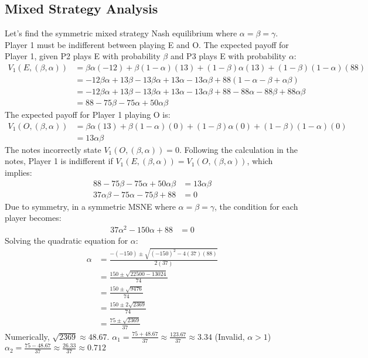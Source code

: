 \documentclass{article}
\begin{document}
\subsection{Mixed Strategy Analysis}
Let's find the symmetric mixed strategy Nash equilibrium where $\alpha = \beta = \gamma$. Player 1 must be indifferent between playing E and O.
The expected payoff for Player 1, given P2 plays E with probability $\beta$ and P3 plays E with probability $\alpha$:
\begin{align*} V_1(E, (\beta, \alpha)) &= \beta \alpha (-12) + \beta (1-\alpha) (13) + (1-\beta) \alpha (13) + (1-\beta) (1-\alpha) (88) \\ &= -12\beta\alpha + 13\beta - 13\beta\alpha + 13\alpha - 13\alpha\beta + 88(1-\alpha-\beta+\alpha\beta) \\ &= -12\beta\alpha + 13\beta - 13\beta\alpha + 13\alpha - 13\alpha\beta + 88 - 88\alpha - 88\beta + 88\alpha\beta \\ &= 88 - 75\beta - 75\alpha + 50\alpha\beta \end{align*}
The expected payoff for Player 1 playing O is:
\begin{align*} V_1(O, (\beta, \alpha)) &= \beta \alpha (13) + \beta (1-\alpha) (0) + (1-\beta) \alpha (0) + (1-\beta) (1-\alpha) (0) \\ &= 13\alpha\beta \end{align*}
The notes incorrectly state $V_1(O, (\beta, \alpha)) = 0$. Following the calculation in the notes, Player 1 is indifferent if $V_1(E, (\beta, \alpha)) = V_1(O, (\beta, \alpha))$, which implies:
\begin{align*} 88 - 75\beta - 75\alpha + 50\alpha\beta &= 13\alpha\beta \\ 37\alpha\beta - 75\alpha - 75\beta + 88 &= 0 \end{align*}
Due to symmetry, in a symmetric MSNE where $\alpha = \beta = \gamma$, the condition for each player becomes:
\begin{align*} 37\alpha^2 - 150\alpha + 88 &= 0 \end{align*}
Solving the quadratic equation for $\alpha$:
\begin{align*} \alpha &= \frac{-(-150) \pm \sqrt{(-150)^2 - 4(37)(88)}}{2(37)} \\ &= \frac{150 \pm \sqrt{22500 - 13024}}{74} \\ &= \frac{150 \pm \sqrt{9476}}{74} \\ &= \frac{150 \pm 2\sqrt{2369}}{74} \\ &= \frac{75 \pm \sqrt{2369}}{37} \end{align*}
Numerically, $\sqrt{2369} \approx 48.67$.
$\alpha_1 = \frac{75 + 48.67}{37} \approx \frac{123.67}{37} \approx 3.34$ (Invalid, $\alpha > 1$)
$\alpha_2 = \frac{75 - 48.67}{37} \approx \frac{26.33}{37} \approx 0.712$
\end{document}
